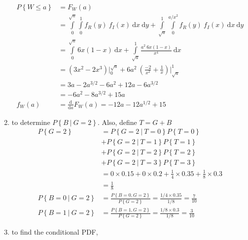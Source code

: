 \begin{enumerate}
		\begin{align}
			P \left\{ W \leq a \right\} &= F_W (a) \nonumber \\
			&= \int\limits_{0}^{\sqrt{a}} \int\limits_{0}^{1}  f_R (y) \ f_I(x) \ \mathrm{d}x \ \mathrm{d}y  + \int\limits_{\sqrt{a}}^{1} \int\limits_{0}^{a/x^2}  f_R (y) \ f_I(x) \ \mathrm{d}x \ \mathrm{d}y \nonumber \\
			&= \int\limits_{0}^{\sqrt{a}}  6x(1-x) \ \mathrm{d}x + \int\limits_{\sqrt{a}}^{1} \frac{a^2\ 6x(1-x)}{x^4} \ \mathrm{d}x \nonumber \\
			&= \left(3x^2 - 2x^3\right) \Big|_0^{\sqrt{a}} + 6a^2\ \left(\frac{-2}{x^2} + \frac{1}{x}\right)\Big|_{\sqrt{a}}^{1} \nonumber \\
			&= 3a - 2a^{3/2} - 6a^2 + 12a -6a^{3/2} \nonumber \\
			&= - 6a^2 - 8a^{3/2} + 15a \\
			f_W (a) &= \frac{\mathrm{d}}{\mathrm{d} a} F_W (a) = -12a - 12a^{1/2} + 15
		\end{align}
	
	
	\item to determine $ P \left\{B\ |\ G = 2\right\} $. Also, define $ T = G+B $ \\
	
		\begin{align}
			P \left\{G = 2\right\} &= P \left\{G = 2\ |\ T = 0\right\}P \left\{T = 0\right\} \nonumber \\
			&+ P \left\{G = 2\ |\ T = 1\right\}P \left\{T = 1\right\} \nonumber \\ 
			&+ P \left\{G = 2\ |\ T = 2\right\}P \left\{T = 2\right\} \nonumber \\
			&+ P \left\{G = 2\ |\ T = 3\right\}P \left\{T = 3\right\} \nonumber \\
			&= 0 \times 0.15 + 0 \times 0.2 + \frac{1}{4} \times 0.35 + \frac{1}{8} \times 0.3 \nonumber \\
			&= \frac{1}{8} \\
			P \left\{B = 0\ |\ G = 2\right\} &= \frac{P \left\{B = 0, G = 2\right\}}{P \left\{G = 2\right\}} = \frac{1/4 \times 0.35}{1/8} = \frac{7}{10} \\
			P \left\{B = 1\ |\ G = 2\right\} &= \frac{P \left\{B = 1, G = 2\right\}}{P \left\{G = 2\right\}} = \frac{1/8 \times 0.3}{1/8} = \frac{3}{10}
		\end{align}
	
	
	\item to find the conditional PDF,
	

\end{enumerate}
